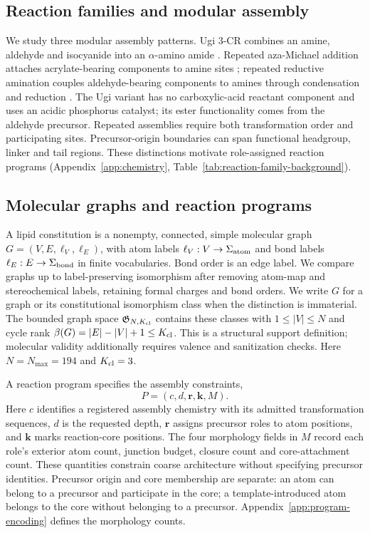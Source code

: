 \documentclass{article}
\theoremstyle{definition}
\begin{document}
\subsection{Reaction families and modular assembly}
\label{sec:reaction-background}
We study three modular assembly patterns. Ugi 3-CR combines an amine, aldehyde and
isocyanide into an $\alpha$-amino amide \citep{xu2024agile}. Repeated aza-Michael addition attaches
acrylate-bearing components to amine sites \citep{li2023combinatorial}; repeated reductive amination
couples aldehyde-bearing components to amines through condensation and reduction
\citep{xue2024barcoding}. The Ugi variant has no carboxylic-acid reactant component and uses an
acidic phosphorus catalyst; its ester functionality comes from the aldehyde precursor.
Repeated assemblies require both transformation order and participating sites. Precursor-origin
boundaries can span functional headgroup, linker and tail regions. These distinctions motivate
role-assigned reaction programs (Appendix~\ref{app:chemistry}, Table~\ref{tab:reaction-family-background}).

\subsection{Molecular graphs and reaction programs}
\label{sec:mathematical-objects}
A lipid constitution is a nonempty, connected, simple molecular graph
$G=(V,E,\ell_V,\ell_E)$, with atom labels $\ell_V:V\to\Sigma_{\rm atom}$ and bond labels
$\ell_E:E\to\Sigma_{\rm bond}$ in finite vocabularies. Bond order is an edge label.
We compare graphs up to label-preserving isomorphism after removing atom-map and stereochemical
labels, retaining formal charges and bond orders. We write $G$ for a graph or its constitutional
isomorphism class when the distinction is immaterial. The bounded graph space
$\mathfrak G_{N,K_{\rm cl}}$ contains these classes with $1\leq|V|\leq N$ and cycle rank
$\beta(G)=|E|-|V|+1\leq K_{\rm cl}$. This is a structural support definition; molecular validity
additionally requires valence and sanitization checks. Here $N=N_{\max}=194$ and $K_{\rm cl}=3$.

A reaction program specifies the assembly constraints,
\begin{equation}
    P=(c,d,\mathbf r,\mathbf k,M).
    \label{eq:reaction-program}
\end{equation}
Here $c$ identifies a registered assembly chemistry with its admitted transformation sequences,
$d$ is the requested depth, $\mathbf r$ assigns precursor roles to
atom positions, and $\mathbf k$ marks reaction-core positions. The four morphology fields in $M$
record each role's exterior atom count, junction budget, closure count and core-attachment count.
These quantities constrain coarse architecture without specifying precursor identities. Precursor
origin and core membership are separate: an atom can belong to a precursor and participate in the
core; a template-introduced atom belongs to the core without belonging to a precursor.
Appendix~\ref{app:program-encoding} defines the morphology counts.
\end{document}
